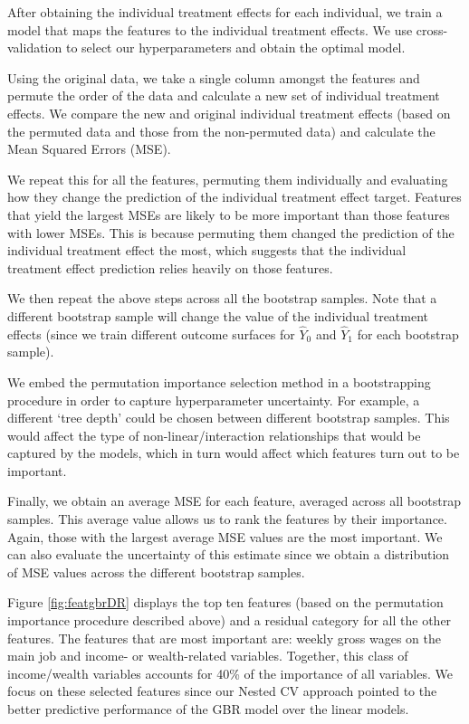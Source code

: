\documentclass[12pt, a4paper]{article}
\begin{document}
After obtaining the individual treatment effects for each individual, we train a model that maps the features to the individual treatment effects. We use cross-validation to select our hyperparameters and obtain the optimal model. 

Using the original data, we take a single column amongst the features and permute the order of the data and calculate a new set of individual treatment effects. We compare the new and original individual treatment effects (based on the permuted data and those from the non-permuted data) and calculate the Mean Squared Errors (MSE). 

We repeat this for all the features, permuting them individually and evaluating how they change the prediction of the individual treatment effect target. Features that yield the largest MSEs are likely to be more important than those features with lower MSEs. This is because permuting them changed the prediction of the individual treatment effect the most, which suggests that the individual treatment effect prediction relies heavily on those features.

We then repeat the above steps across all the bootstrap samples. Note that a different bootstrap sample will change the value of the individual treatment effects (since we train different outcome surfaces for $\hat{Y}_0$ and $\hat{Y}_1$ for each bootstrap sample).

We embed the permutation importance selection method in a bootstrapping procedure in order to capture hyperparameter uncertainty. For example, a different `tree depth' could be chosen between different bootstrap samples. This would affect the type of non-linear/interaction relationships that would be captured by the models, which in turn would affect which features turn out to be important. 

Finally, we obtain an average MSE for each feature, averaged across all bootstrap samples. This average value allows us to rank the features by their importance. Again, those with the largest average MSE values are the most important. We can also evaluate the uncertainty of this estimate since we obtain a distribution of MSE values across the different bootstrap samples.

Figure \ref{fig:featgbrDR} displays the top ten features (based on the permutation importance procedure described above) and a residual category for all the other features. The features that are most important are: weekly gross wages on the main job and income- or wealth-related variables. Together, this class of income/wealth variables accounts for 40\% of the importance of all variables. We focus on these selected features since our Nested CV approach pointed to the better predictive performance of the GBR model over the linear models.
\end{document}
